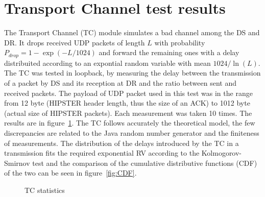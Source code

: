 \documentclass[10pt,onecolumn]{article}
\begin{document}
\section{Transport Channel test results}
The Transport Channel (TC) module simulates a bad channel among the DS and DR. It drops received UDP packets of length $L$ with probability $P_{drop} = 1 - \exp(-L/1024)$ and forward the remaining ones with a delay distribuited according to an expontial random variable with mean $1024/\ln(L)$. \\
The TC was tested in loopback, by measuring the delay between the transmission of a packet by DS and its reception at DR and the ratio between sent and received packets. The payload of UDP packet used in this test was in the range from 12 byte (HIPSTER header length, thus the size of an ACK) to 1012 byte (actual size of HIPSTER packets). Each measurement was taken 10 times. The results are in figure~\ref{fig:TCstats}. The TC follows accurately the theoretical model, the few discrepancies are related to the Java random number generator and the finiteness of measurements. The distribution of the delays introduced by the TC in a transmission fits the required exponential RV according to the Kolmogorov-Smirnov test and the comparison of the cumulative distributive functions (CDF) of the two can be seen in figure~\ref{fig:CDF}.
\begin{figure}[h]
  \centering
  \caption{TC statistics}
  \label{fig:TCstats}
\end{figure}
\end{document}
